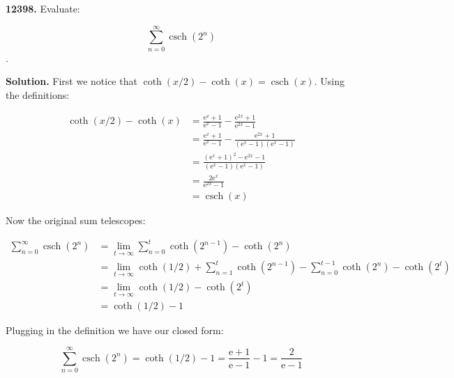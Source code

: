 \documentclass{letter}
\DeclareMathOperator{\csch}{csch}
\begin{document}
\newtheorem{lemma}{Lemma}

\begin{letter}{}
  \textbf{12398.} Evaluate:

  $$\sum_{n=0}^\infty \csch \left(2^n\right)$$.

  \textbf{Solution.} First we notice that $\coth(x/2)-\coth(x)=\csch(x)$. Using the definitions:

\begin{align*}
  \coth\left(x/2\right) - \coth\left(x\right) &=
  \frac{\mathrm{e}^x+1}{\mathrm{e}^x-1} 
  - \frac{\mathrm{e}^{2x}+1}{\mathrm{e}^{2x}-1}\\
  &=
  \frac{\mathrm{e}^x+1}{\mathrm{e}^x-1} 
  - \frac{\mathrm{e}^{2x}+1}{\left(\mathrm{e}^{x}-1\right)\left(\mathrm{e}^{x}-1\right)}\\
  &=
  \frac{\left(\mathrm{e}^x+1\right)^2 - \mathrm{e}^{2x} - 1}
  {\left(\mathrm{e}^{x}-1\right)\left(\mathrm{e}^{x}-1\right)}\\
  &=
  \frac{2\mathrm{e}^{x}}{\mathrm{e}^{2x}-1}\\
  &= \csch\left(x\right)
\end{align*}

Now the original sum telescopes:

\begin{align*}
  \sum_{n=0}^\infty \csch \left(2^n\right)
  &=
  \lim_{t\to \infty} 
  \sum_{n=0}^t
    \coth \left(2^{n-1}\right) - \coth \left(2^n\right)\\
  &= 
    \lim_{t\to \infty} 
    \coth \left(1/2\right) + 
        \sum_{n=1}^t \coth\left(2^{n-1}\right) - 
        \sum_{n=0}^{t-1} \coth\left(2^{n}\right)
    - \coth\left(2^t\right)\\
  &= 
    \lim_{t\to \infty} 
    \coth \left(1/2\right)  
    - \coth\left(2^t\right)\\
  &= \coth\left(1/2\right) - 1
\end{align*}

Plugging in the definition we have our closed form: 

$$\sum_{n=0}^\infty \csch \left(2^n\right)
  = \coth\left(1/2\right) - 1 = \frac{\mathrm{e}+1}{\mathrm{e}-1}-1
  = \frac{2}{\mathrm{e}-1}$$

\end{letter}
\end{document}
